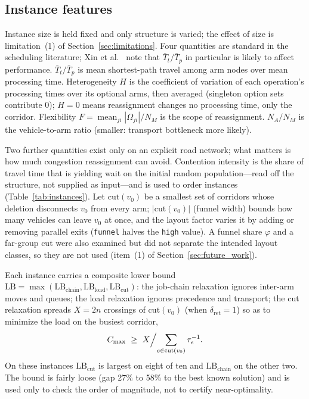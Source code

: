 \documentclass[manuscript,screen,review]{acmart}
\newcommand{\LBGapLo}{27\%}
\newcommand{\LBGapHi}{58\%}
\begin{document}
\subsection{Instance features}
\label{sec:features}

Instance size is held fixed and only structure is varied; the effect of size is limitation~(1) of Section~\ref{sec:limitations}.
Four quantities are standard in the scheduling literature; Xin et al.~\cite{xin2025review} note that $\bar{T}_t/\bar{T}_p$ in particular is likely to affect performance.
$\bar{T}_t/\bar{T}_p$ is mean shortest-path travel among arm nodes over mean processing time.
Heterogeneity $H$ is the coefficient of variation of each operation's processing times over its optional arms, then averaged (singleton option sets contribute $0$); $H=0$ means reassignment changes no processing time, only the corridor.
Flexibility $F=\operatorname{mean}_{ji}|\Omega_{ji}|/N_M$ is the scope of reassignment.
$N_A/N_M$ is the vehicle-to-arm ratio (smaller: transport bottleneck more likely).

Two further quantities exist only on an explicit road network; what matters is how much congestion reassignment can avoid.
Contention intensity is the share of travel time that is yielding wait on the initial random population---read off the structure, not supplied as input---and is used to order instances (Table~\ref{tab:instances}).
Let $\mathrm{cut}(v_0)$ be a smallest set of corridors whose deletion disconnects $v_0$ from every arm; $|\mathrm{cut}(v_0)|$ (funnel width) bounds how many vehicles can leave $v_0$ at once, and the layout factor varies it by adding or removing parallel exits (\texttt{funnel} halves the \texttt{high} value).
A funnel share $\varphi$ and a far-group cut were also examined but did not separate the intended layout classes, so they are not used (item~(1) of Section~\ref{sec:future_work}).

Each instance carries a composite lower bound
$\mathrm{LB}=\max(\mathrm{LB}_{\text{chain}},\mathrm{LB}_{\text{load}},
\mathrm{LB}_{\text{cut}})$:
the job-chain relaxation ignores inter-arm moves and queues; the load relaxation ignores precedence and transport; the cut relaxation spreads $X=2n$ crossings of $\mathrm{cut}(v_0)$ (when $\delta_{\mathrm{ret}}=1$) so as to minimize the load on the busiest corridor,
\begin{equation}
\label{eq:lbcut}
C_{\max}\ \ge\ X\Bigl/\sum_{e\in \mathrm{cut}(v_0)}\tau_e^{-1}.
\end{equation}
On these instances $\mathrm{LB}_{\text{cut}}$ is largest on eight of ten and $\mathrm{LB}_{\text{chain}}$ on the other two.
The bound is fairly loose (gap \LBGapLo{} to \LBGapHi{} to the best known solution) and is used only to check the order of magnitude, not to certify near-optimality.
\end{document}
